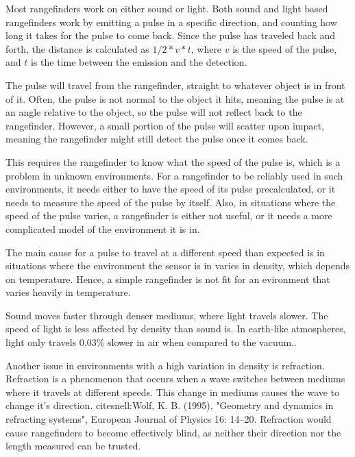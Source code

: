 Most rangefinders work on either sound or light. Both sound and light based rangefinders work by emitting a pulse in a specific direction, and counting how long it takes for the pulse to come back. Since the pulse has traveled back and forth, the distance is calculated as \(1/2*v*t\), where \(v\) is the speed of the pulse, and \(t\) is the time between the emission and the detection.

The pulse will travel from the rangefinder, straight to whatever object is in front of it. Often, the pulse is not normal to the object it hits, meaning the pulse is at an angle relative to the object, so the pulse will not reflect back to the rangefinder. However, a small portion of the pulse will scatter upon impact, meaning the rangefinder might still detect the pulse once it comes back.

This requires the rangefinder to know what the speed of the pulse is, which is a problem in unknown environments. For a rangefinder to be reliably used in such environments, it needs either to have the speed of its pulse precalculated, or it needs to measure the speed of the pulse by itself. Also, in situations where the speed of the pulse varies, a rangefinder is either not useful, or it needs a more complicated model of the environment it is in.

The main cause for a pulse to travel at a different speed than expected is in situations where the environment the sensor is in varies in density, which depends on temperature\cite{refraction}. Hence, a simple rangefinder is not fit for an evironment that varies heavily in temperature.

Sound moves faster through denser mediums, where light travels slower. The speed of light is less affected by density than sound is. In earth-like atmospheres, light only travels 0.03\% slower in air when compared to the vacuum.\cite{refraction}\cite{speedOfSound}.

Another issue in environments with a high variation in density is refraction. Refraction is a phenomenon that occurs when a wave switches between mediums where it travels at different speeds. This change in mediums causes the wave to change it's direction. cite{snell:Wolf, K. B. (1995), "Geometry and dynamics in refracting systems", European Journal of Physics 16: 14–20.} Refraction would cause rangefinders to become effectively blind, as neither their direction nor the length measured can be trusted.

